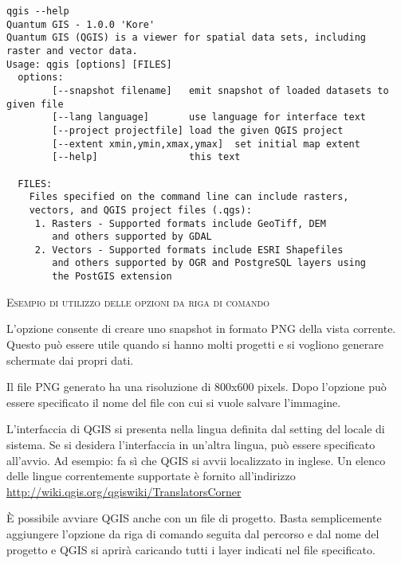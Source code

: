 \small
\begin{verbatim}
qgis --help
Quantum GIS - 1.0.0 'Kore'
Quantum GIS (QGIS) is a viewer for spatial data sets, including
raster and vector data.
Usage: qgis [options] [FILES]
  options:
        [--snapshot filename]   emit snapshot of loaded datasets to given file
        [--lang language]       use language for interface text
        [--project projectfile] load the given QGIS project
        [--extent xmin,ymin,xmax,ymax]  set initial map extent
        [--help]                this text

  FILES:
    Files specified on the command line can include rasters,
    vectors, and QGIS project files (.qgs):
     1. Rasters - Supported formats include GeoTiff, DEM
        and others supported by GDAL
     2. Vectors - Supported formats include ESRI Shapefiles
        and others supported by OGR and PostgreSQL layers using
        the PostGIS extension
\end{verbatim}
\normalsize

\begin{Tip} \caption{\textsc{Esempio di utilizzo delle opzioni da riga di comando}}
\end{Tip}

L'opzione consente di creare uno snapshot in formato PNG della vista corrente.
Questo può essere utile quando si hanno molti progetti e si vogliono
generare schermate dai propri dati.

Il file PNG generato ha una risoluzione di 800x600 pixels. Dopo l'opzione
 può essere specificato il nome del file con cui si vuole salvare l'immagine.

L'interfaccia di QGIS si presenta nella lingua definita dal setting del locale di sistema.
Se si desidera l'interfaccia in un'altra lingua, può essere specificato all'avvio. Ad esempio:
 fa sì che QGIS si avvii localizzato in inglese.
Un elenco delle lingue correntemente supportate è fornito all'indirizzo
\url{http://wiki.qgis.org/qgiswiki/TranslatorsCorner} 

È possibile avviare QGIS anche con un file di progetto. Basta semplicemente
aggiungere l'opzione da riga di comando  seguita dal percorso e dal nome
del progetto e QGIS si aprirà caricando tutti i layer indicati nel file specificato.

